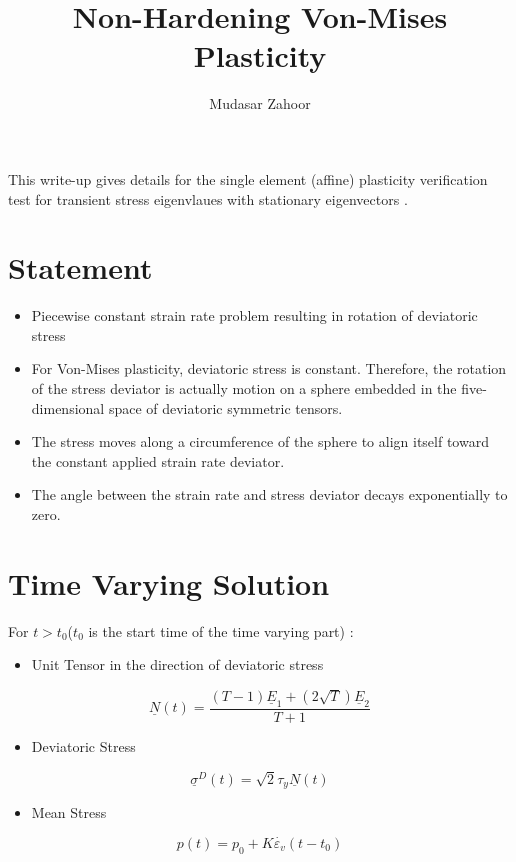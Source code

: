 \documentclass[10pt,letterpaper]{article}
\author{Mudasar Zahoor}
\date{}
\begin{document}
\title{Non-Hardening Von-Mises Plasticity}
\maketitle


This write-up gives details for the single element (affine) plasticity verification test for transient stress eigenvlaues with stationary eigenvectors \cite{kamojjala2015}.

\section{Statement}
\begin{itemize}
\item Piecewise constant strain rate problem resulting in rotation of deviatoric
stress
\item For Von-Mises plasticity, deviatoric stress is constant. Therefore,
the rotation of the stress deviator is actually motion on a sphere
embedded in the five-dimensional space of deviatoric symmetric tensors.
\item The stress moves along a circumference of the sphere to align itself
toward the constant applied strain rate deviator.
\item The angle between the strain rate and stress deviator decays exponentially
to zero.
\end{itemize}

\section{Time Varying Solution}

For $t>t_{0}$($t_{0}$ is the start time of the time varying part) \cite{Brannon_2}:
\begin{itemize}
\item Unit Tensor in the direction of deviatoric stress
\end{itemize}
\[
\underline{N}\left(t\right)=\frac{\left(T-1\right)\underline{E}_{1}+\left(2\sqrt{T}\right)\underline{E}_{2}}{T+1}
\]

\begin{itemize}
\item Deviatoric Stress
\end{itemize}
\[
\underline{\sigma}^{D}\left(t\right)=\sqrt{2}\tau_{y}\underline{N}\left(t\right)
\]

\begin{itemize}
\item Mean Stress
\end{itemize}
\[
p\left(t\right)=p_{0}+K\dot{\varepsilon_{v}}\left(t-t_{0}\right)
\]
\end{document}
